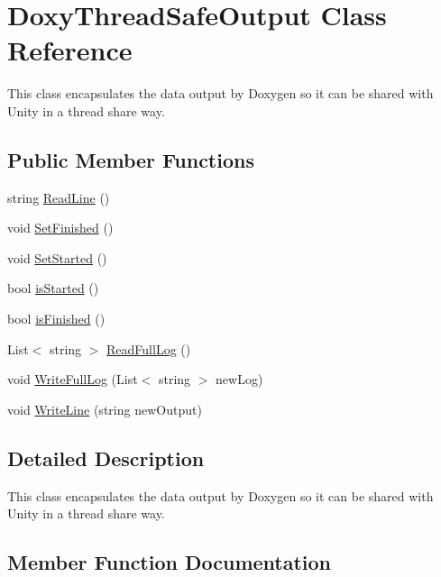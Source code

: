 \hypertarget{class_doxy_thread_safe_output}{}\section{Doxy\+Thread\+Safe\+Output Class Reference}
\label{class_doxy_thread_safe_output}


This class encapsulates the data output by Doxygen so it can be shared with Unity in a thread share way.  


\subsection*{Public Member Functions}
\begin{DoxyCompactItemize}
\item 
string \hyperlink{class_doxy_thread_safe_output_a84958c6ebe8de10ced504bf5f2fde015}{Read\+Line} ()
\item 
void \hyperlink{class_doxy_thread_safe_output_a97e2149569e2bb5e749851daa2781423}{Set\+Finished} ()
\item 
void \hyperlink{class_doxy_thread_safe_output_ad08186c77f145bc3cb1ddb50259ef589}{Set\+Started} ()
\item 
bool \hyperlink{class_doxy_thread_safe_output_afc9e32fd7203a5c6c74ee914241c3e79}{is\+Started} ()
\item 
bool \hyperlink{class_doxy_thread_safe_output_a676622488e7bec792b66693fc1f20e73}{is\+Finished} ()
\item 
List$<$ string $>$ \hyperlink{class_doxy_thread_safe_output_a40486922d565c2b83934fd8e863bf843}{Read\+Full\+Log} ()
\item 
void \hyperlink{class_doxy_thread_safe_output_aa831eccd758e59c835fd3486c39a4a8c}{Write\+Full\+Log} (List$<$ string $>$ new\+Log)
\item 
void \hyperlink{class_doxy_thread_safe_output_ab2083e9efa17a35c72d3c2c784ef6800}{Write\+Line} (string new\+Output)
\end{DoxyCompactItemize}


\subsection{Detailed Description}
This class encapsulates the data output by Doxygen so it can be shared with Unity in a thread share way. 



\subsection{Member Function Documentation}
